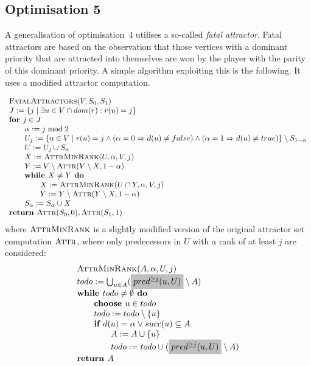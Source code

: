 \documentclass{article}
\begin{document}
\subsection{Optimisation 5} 

A generalisation of optimisation~4 utilises a so-called \emph{fatal attractor}. Fatal attractors are based on the
observation that those vertices with a dominant priority that are attracted into themselves are won by the player
with the parity of this dominant priority. A simple algorithm exploiting this is the following. It uses a modified
attractor computation.

\begin{equation*}
\begin{array}{l}
\text{\textsc{FatalAttractors}}(V, S_0, S_1)\\
J := \{ j \mid \exists u \in V \cap dom(r) : r(u) = j \} \\
\textbf{for } j \in J \\
\qquad \alpha := j \bmod 2\\
\qquad U_j := \{u \in V \mid r(u) = j \wedge (\alpha = 0 \Rightarrow d(u) \neq false) 
\wedge (\alpha = 1 \Rightarrow d(u) \neq true) \} \setminus S_{1 - \alpha} \\
\qquad U := U_j \cup S_\alpha\\
\qquad X := \textsc{AttrMinRank}(U, \alpha, V, j) \\
\qquad Y := V \setminus \textsc{Attr}(V \setminus X, 1-\alpha) \\
\qquad \textbf{while } X \neq Y \textbf{ do }\\
\qquad \qquad X := \textsc{AttrMinRank}(U \cap Y, \alpha, V, j) \\
\qquad \qquad Y := Y \setminus \textsc{Attr}(Y \setminus X, 1-\alpha) \\
\qquad S_\alpha := S_\alpha \cup X \\
\textbf{return } \textsc{Attr}(S_0, 0), \textsc{Attr}(S_1, 1)
\end{array}
\end{equation*}
where $\textsc{AttrMinRank}$ is a slightly modified version of the original attractor
set computation $\textsc{Attr}$, where only predecessors in $U$ with a rank of at least
$j$ are considered:
\begin{equation*}
\begin{array}{l}
\text{\textsc{AttrMinRank}}(A, \alpha, U, j) \\
todo := \bigcup_{u \in A} (%
\colorbox{lightgray}{$ pred^{\geq j}(u, U) $}%
\setminus A) \\
\textbf{while } todo \neq \emptyset \textbf{ do} \\
\qquad \textbf{choose } u \in todo \\
\qquad todo := todo \setminus \{u\} \\
\qquad \textbf{if } d(u) = \alpha \vee succ(u) \subseteq A \\
\qquad \qquad A := A \cup \{u \} \\
\qquad \qquad todo := todo \cup (%
\colorbox{lightgray}{$ pred^{\geq j}(u, U) $}%
\setminus A)  \\
\textbf{return } A
\end{array}
\end{equation*}
\end{document}
